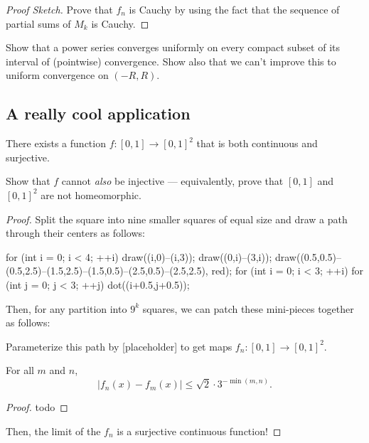 \documentclass[10pt]{scrartcl}
\begin{document}
\begin{proof}[Proof Sketch]
	Prove that $f_n$ is Cauchy by using the fact that
	the sequence of partial sums of $M_k$ is Cauchy.
\end{proof}

\begin{exercise}
	Show that a power series converges uniformly on every compact subset
	of its interval of (pointwise) convergence.
	Show also that we can't improve this to uniform convergence on $(-R, R)$.
\end{exercise}

\subsection{A really cool application}

\begin{theorem}
	There exists a function $f\colon[0,1]\to[0,1]^2$
	that is both continuous and surjective.
\end{theorem}

\begin{exercise}
	Show that $f$ cannot \emph{also} be injective ---
	equivalently, prove that $[0,1]$ and $[0,1]^2$ are not homeomorphic.
\end{exercise}

\begin{proof}
	Split the square into nine smaller squares of equal size
	and draw a path through their centers as follows:
	\begin{center}
		\begin{asy}
			for (int i = 0; i < 4; ++i) {
				draw((i,0)--(i,3));
				draw((0,i)--(3,i));
			}
			draw((0.5,0.5)--(0.5,2.5)--(1.5,2.5)--(1.5,0.5)--(2.5,0.5)--(2.5,2.5), red);
			for (int i = 0; i < 3; ++i) {
				for (int j = 0; j < 3; ++j) {
					dot((i+0.5,j+0.5));
				}
			}
		\end{asy}
	\end{center}

	Then, for any partition into $9^k$ squares, we can patch
	these mini-pieces together as follows:
	
	Parameterize this path by [placeholder]
	to get maps $f_n\colon[0,1]\to[0,1]^2$.
	
	\begin{claim}
		For all $m$ and $n$,
		\[|f_n(x) - f_m(x)| \le \sqrt2\cdot 3^{-\min(m, n)}.\]
	\end{claim}
	\begin{proof}
		todo
	\end{proof}

	Then, the limit of the $f_n$ is a surjective continuous function!
\end{proof}
\end{document}

